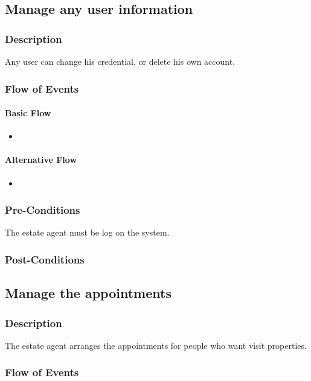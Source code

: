 \documentclass[a4paper,12pt]{article}
\begin{document}
\subsection{Manage any user information}
\subsubsection{Description}
Any user can change his credential, or delete his own account.
\subsubsection{Flow of Events}
\paragraph{Basic Flow}
\begin{itemize}
\item
\end{itemize}
\paragraph{Alternative Flow}
\begin{itemize}
\item
\end{itemize}
\subsubsection{Pre-Conditions}
The estate agent must be log on the system.
\subsubsection{Post-Conditions}

\subsection{Manage the appointments}
\subsubsection{Description}
The estate agent arranges the appointments for people who want visit properties.
\subsubsection{Flow of Events}
\end{document}
